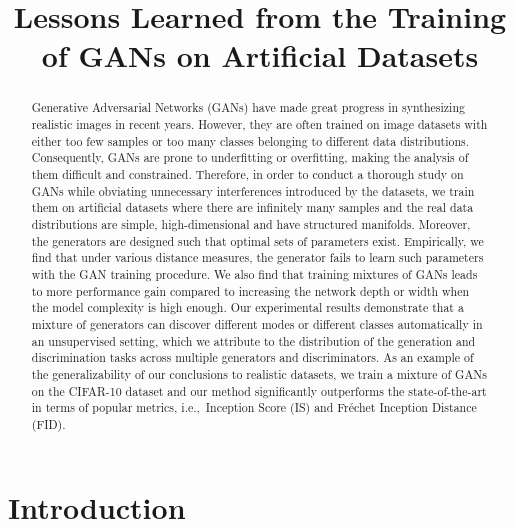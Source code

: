 \documentclass[conference]{IEEEtran}
\newcommand{\ie}{{i.e.,~}}
\begin{document}
\title{Lessons Learned from the Training of GANs on Artificial Datasets}
\author{
}

\maketitle



\begin{abstract}
Generative Adversarial Networks (GANs) have made great progress in synthesizing realistic images in recent years. However, they are often trained on image datasets with either too few samples or too many classes belonging to different data distributions. Consequently, GANs are prone to underfitting or overfitting, making the analysis of them difficult and constrained. 
Therefore, in order to conduct a thorough study on GANs while obviating unnecessary interferences introduced by the datasets, we train them on artificial datasets where there are infinitely many samples and the real data distributions are simple, high-dimensional and have structured manifolds.
Moreover, the generators are designed such that optimal sets of parameters exist.
Empirically, we find that under various distance measures, the generator fails to learn such parameters with the GAN training procedure.
We also find that training mixtures of GANs leads to more performance gain compared to increasing the network depth or width when the model complexity is high enough. Our experimental results demonstrate that a mixture of generators can discover different modes or different classes automatically in an unsupervised setting, which we attribute to the distribution of the generation and discrimination tasks across multiple generators and discriminators. 
As an example of the generalizability of our conclusions to realistic datasets, we train a mixture of GANs on the CIFAR-10 dataset and our method significantly outperforms the state-of-the-art in terms of popular metrics, \ie Inception Score (IS) and Fréchet Inception Distance (FID).
\end{abstract}



\section{Introduction}\label{sec:introduction}
\end{document}
